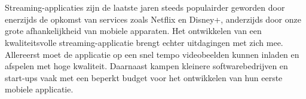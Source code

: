 
\chapter{}%
\label{ch:inleiding}



\section{}%
\label{sec:probleemstelling}


Streaming-applicaties zijn de laatste jaren steeds populairder geworden door enerzijds de opkomst van services zoals Netflix en Disney+, anderzijds door onze grote afhankelijkheid van mobiele apparaten. Het ontwikkelen van een kwaliteitsvolle streaming-applicatie brengt echter uitdagingen met zich mee. Allereerst moet de applicatie op een snel tempo videobeelden kunnen inladen en afspelen met hoge kwaliteit. Daarnaast kampen kleinere softwarebedrijven en start-ups vaak met een beperkt budget voor het ontwikkelen van hun eerste mobiele applicatie.

